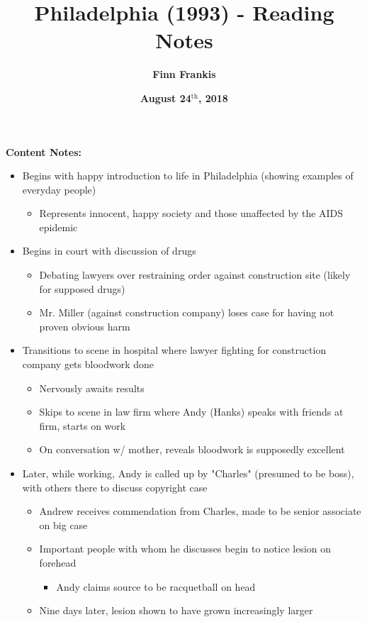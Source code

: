 \documentclass{article}
\title{\textbf{Philadelphia (1993) - Reading Notes}}
\author{\textbf{Finn Frankis}}
\date{\textbf{August 24$^\text{th}$, 2018}}
\begin{document}
    \maketitle
    \textbf{Content Notes:}
    \begin{itemize}
        \item Begins with happy introduction to life in Philadelphia (showing examples of everyday people)
        \begin{itemize}
            \item Represents innocent, happy society and those unaffected by the AIDS epidemic
        \end{itemize}
        \item Begins in court with discussion of drugs
        \begin{itemize}
            \item Debating lawyers over restraining order against construction site (likely for supposed drugs)
            \item Mr. Miller (against construction company) loses case for having not proven obvious harm
        \end{itemize}
        \item Transitions to scene in hospital where lawyer fighting for construction company gets bloodwork done
        \begin{itemize}
            \item Nervously awaits results
            \item Skips to scene in law firm where Andy (Hanks) speaks with friends at firm, starts on work
            \item On conversation w/ mother, reveals bloodwork is supposedly excellent
        \end{itemize}
        \item Later, while working, Andy is called up by "Charles" (presumed to be boss), with others there to discuss copyright case 
        \begin{itemize}
            \item Andrew receives commendation from Charles, made to be senior associate on big case
            \item Important people with whom he discusses begin to notice lesion on forehead
            \begin{itemize}
                \item Andy claims source to be racquetball on head
            \end{itemize}
            \item Nine days later, lesion shown to have grown increasingly larger

\end{itemize}
\end{itemize}
\end{document}
